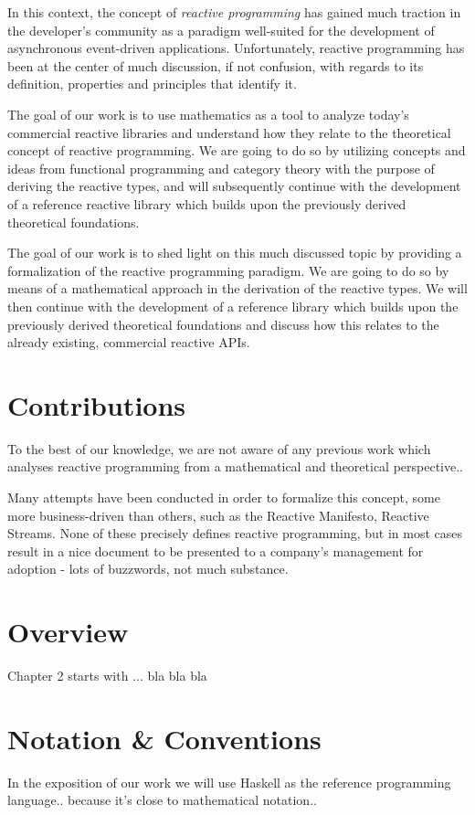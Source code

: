 In this context, the concept of \textit{reactive programming} has gained much traction in the developer's community as a paradigm well-suited for the development of asynchronous  event-driven applications\cite{bainomugisha2013survey}. Unfortunately, reactive programming has been at the center of much discussion, if not confusion, with regards to its definition, properties and principles that identify it\cite{meijer2014reactive}.

The goal of our work is to use mathematics as a tool to analyze today's commercial reactive libraries and understand how they relate to the theoretical concept of reactive programming.  We are going to do so by utilizing concepts and ideas from functional programming and category theory with the purpose of deriving the reactive types, and will subsequently continue with the development of a reference reactive library which builds upon the previously derived theoretical foundations. 

The goal of our work is to shed light on this much discussed topic by providing a formalization of the reactive programming paradigm. We are going to do so by means of a mathematical approach in the derivation of the reactive types. We will then continue with the development of a reference library which builds upon the previously derived theoretical foundations and discuss how this relates to the already existing, commercial reactive APIs.

\section*{Contributions}
To the best of our knowledge, we are not aware of any previous work which analyses reactive programming from a mathematical and theoretical perspective.. 

Many attempts have been conducted in order to formalize this concept, some more business-driven than others, such as the Reactive Manifesto, Reactive Streams. None of these precisely defines reactive programming, but in most cases result in a nice document to be presented to a company's management for adoption - lots of buzzwords, not much substance.


\section*{Overview}

Chapter 2 starts with ... bla bla bla


\section*{Notation \& Conventions}

In the exposition of our work we will use Haskell as the reference programming language.. because it's close to mathematical notation..

